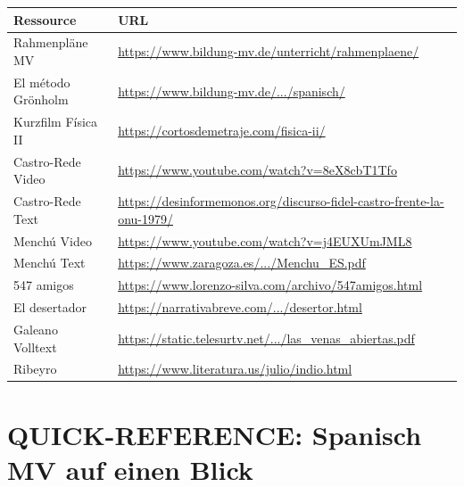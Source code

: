 \documentclass[11pt,a4paper]{article}
\begin{document}
\begin{center}
\footnotesize
\begin{tabularx}{\textwidth}{l|X}
\rowcolor{lightblue}
\textbf{Ressource} & \textbf{URL} \\
\hline
Rahmenpläne MV & \url{https://www.bildung-mv.de/unterricht/rahmenplaene/} \\
\rowcolor{lightgray}
El método Grönholm & \url{https://www.bildung-mv.de/.../spanisch/} \\
Kurzfilm Física II & \url{https://cortosdemetraje.com/fisica-ii/} \\
\rowcolor{lightgray}
Castro-Rede Video & \url{https://www.youtube.com/watch?v=8eX8cbT1Tfo} \\
Castro-Rede Text & \url{https://desinformemonos.org/discurso-fidel-castro-frente-la-onu-1979/} \\
\rowcolor{lightgray}
Menchú Video & \url{https://www.youtube.com/watch?v=j4EUXUmJML8} \\
Menchú Text & \url{https://www.zaragoza.es/.../Menchu_ES.pdf} \\
\rowcolor{lightgray}
547 amigos & \url{https://www.lorenzo-silva.com/archivo/547amigos.html} \\
El desertador & \url{https://narrativabreve.com/.../desertor.html} \\
\rowcolor{lightgray}
Galeano Volltext & \url{https://static.telesurtv.net/.../las_venas_abiertas.pdf} \\
Ribeyro & \url{https://www.literatura.us/julio/indio.html} \\
\hline
\end{tabularx}
\end{center}

\newpage
\section*{QUICK-REFERENCE: Spanisch MV auf einen Blick}

\begin{center}
\end{center}

\vspace{0.3cm}
\end{document}
